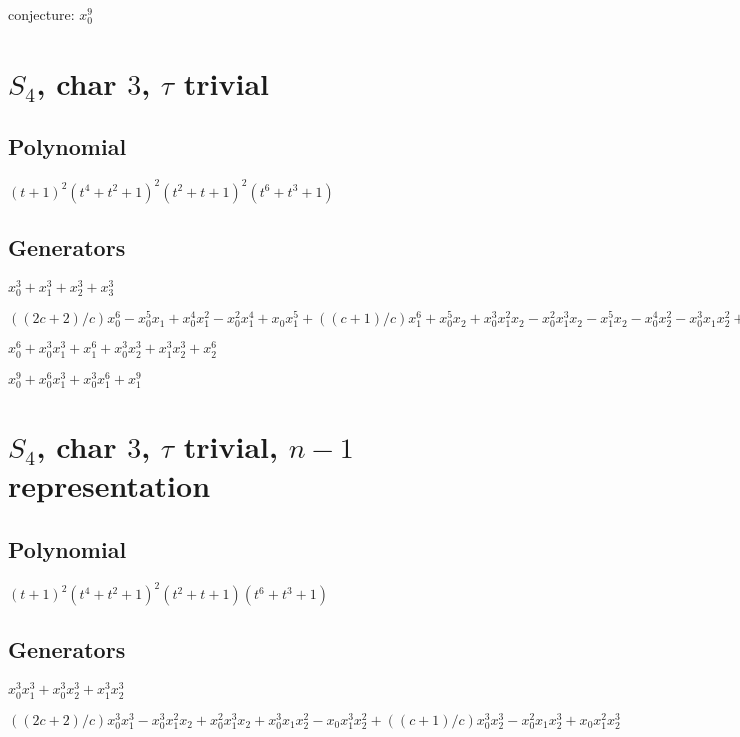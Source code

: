 \documentclass{article}
\numberwithin{equation}{section}
\begin{document}
conjecture: $x_0^9$

\section{$S_4$, char $3$, $\tau$ trivial}

\subsection{Polynomial}

$(t+1)^2(t^4+t^2+1)^2(t^2+t+1)^2(t^6+t^3+1)$

\subsection{Generators}

$x_0^3 + x_1^3 + x_2^3 + x_3^3$

$((2c + 2)/c)x_0^6 - x_0^5x_1 + x_0^4x_1^2 - x_0^2x_1^4 + x_0x_1^5
+ ((c + 1)/c)x_1^6 + x_0^5x_2 + x_0^3x_1^2x_2 - x_0^2x_1^3x_2 -
x_1^5x_2 - x_0^4x_2^2 - x_0^3x_1x_2^2 + x_0x_1^3x_2^2 +
x_1^4x_2^2 + ((c + 1)/c)x_0^3x_2^3 + x_0^2x_1x_2^3 -
x_0x_1^2x_2^3 + ((2c + 2)/c)x_1^3x_2^3 + x_0^2x_2^4 - x_1^2x_2^4
- x_0x_2^5 + x_1x_2^5 + x_0^3x_1^2x_3 - x_0^2x_1^3x_3 -
x_0^3x_2^2x_3 + x_1^3x_2^2x_3 + x_0^2x_2^3x_3 - x_1^2x_2^3x_3 -
x_0^3x_1x_3^2 + x_0x_1^3x_3^2 + x_0^3x_2x_3^2 - x_1^3x_2x_3^2 -
x_0x_2^3x_3^2 + x_1x_2^3x_3^2$

$x_0^6 + x_0^3x_1^3 + x_1^6 + x_0^3x_2^3 + x_1^3x_2^3 + x_2^6$

$x_0^9 + x_0^6x_1^3 + x_0^3x_1^6 + x_1^9$


\section{$S_4$, char $3$, $\tau$ trivial, $n-1$ representation}

\subsection{Polynomial}

$(t+1)^2(t^4+t^2+1)^2(t^2+t+1)(t^6+t^3+1)$


\subsection{Generators}

$x_0^3x_1^3 + x_0^3x_2^3 + x_1^3x_2^3$ 

$((2c + 2)/c)x_0^3x_1^3 - x_0^3x_1^2x_2 + x_0^2x_1^3x_2 + x_0^3x_1x_2^2 - x_0x_1^3x_2^2 + ((c + 1)/c)x_0^3x_2^3 - x_0^2x_1x_2^3 + x_0x_1^2x_2^3$  
\end{document}
